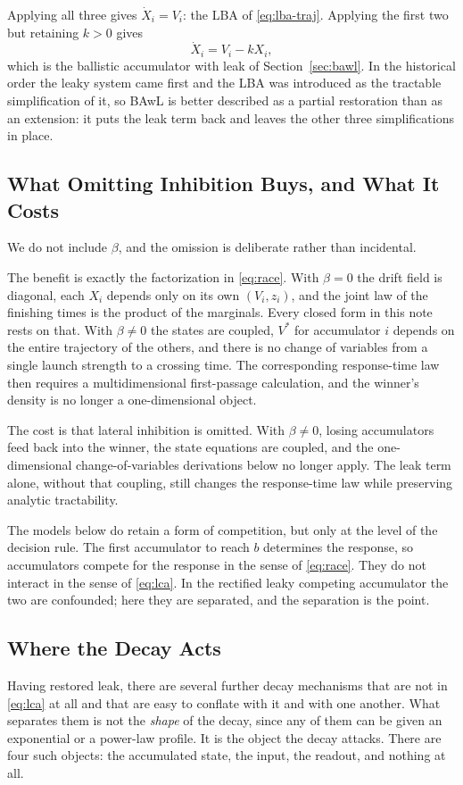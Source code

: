 \documentclass[12pt]{article}
\theoremstyle{remark}
\begin{document}
Applying all three gives $\dot X_i = V_i$: the LBA of
\eqref{eq:lba-traj}. Applying the first two but retaining $k > 0$ gives
\begin{equation}
  \dot X_i = V_i - k X_i,
  \label{eq:bawl-gen}
\end{equation}
which is the ballistic accumulator with leak of Section~\ref{sec:bawl}. In the historical order the leaky system came first and the LBA was introduced as the tractable simplification of it, so BAwL is better described as a partial restoration than as an extension: it puts the leak term back and leaves the other three simplifications in place.

\subsection{What Omitting Inhibition Buys, and What It Costs}
We do not include $\beta$, and the omission is deliberate rather than incidental.

The benefit is exactly the factorization in \eqref{eq:race}. With $\beta = 0$ the drift field is diagonal, each $X_i$ depends only on its own $(V_i, z_i)$, and the joint law of the finishing times is the product of the marginals. Every closed form in this note rests on that. With $\beta \ne 0$ the states are coupled, $V^{*}$ for accumulator $i$ depends on the entire trajectory of the others, and there is no change of variables from a single launch strength to a crossing time. The corresponding response-time law then requires a multidimensional first-passage calculation, and the winner's density is no longer a one-dimensional object.

The cost is that lateral inhibition is omitted. With $\beta\ne0$, losing accumulators feed back into the winner, the state equations are coupled, and the one-dimensional change-of-variables derivations below no longer apply. The leak term alone, without that coupling, still changes the response-time law while preserving analytic tractability.

The models below do retain a form of competition, but only at the level of the decision rule. The first accumulator to reach $b$ determines the response, so accumulators compete for the response in the sense of \eqref{eq:race}. They do not interact in the sense of
\eqref{eq:lca}. In the rectified leaky competing accumulator the two are
confounded; here they are separated, and the separation is the point.

\subsection{Where the Decay Acts}
\label{sec:decay-targets}
Having restored leak, there are several further decay mechanisms that are not in \eqref{eq:lca} at all and that are easy to conflate with it and with one another. What separates them is not the \emph{shape} of the decay, since any of them can be given an exponential or a power-law profile. It is the object the decay attacks. There are four such objects: the accumulated state, the input, the readout, and nothing at all.
\end{document}
